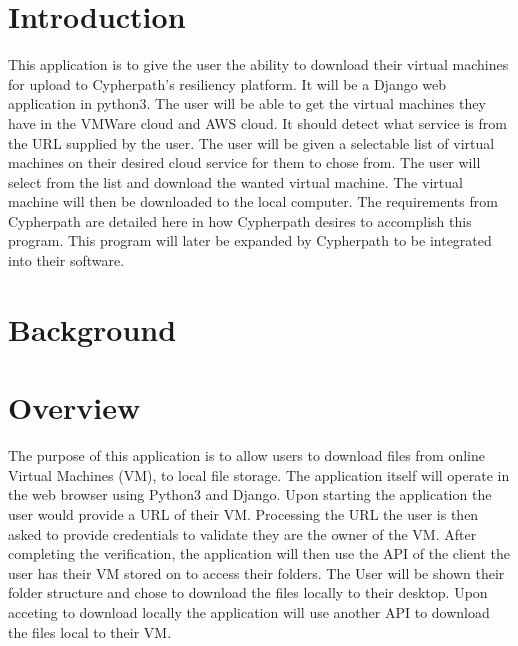 \documentclass{article}
\title{}
\author{}
\date{}
\begin{document}
    

    \tableofcontents
    \listoffigures

    \newpage
    \begin{versionhistory}
    \end{versionhistory}
    \newpage

    \section{Introduction}
    This application is to give the user the ability to download their virtual machines for upload to Cypherpath’s resiliency platform. It will be a Django web application in python3. The user will be able to get the virtual machines they have in the VMWare cloud and AWS cloud. It should detect what service is from the URL supplied by the user. The user will be given a selectable list of virtual machines on their desired cloud service for them to chose from. The user will select from the list and download the wanted virtual machine. The virtual machine will then be downloaded to the local computer. 
    The requirements from Cypherpath are detailed here in how Cypherpath desires to accomplish this program. This program will later be expanded by Cypherpath to be integrated into their software.     
    
    \section{Background}

    \section{Overview}

    The purpose of this application is to allow users to download files from online Virtual Machines (VM), to local file storage.
    The application itself will operate in the web browser using Python3 and Django. Upon starting the application the user would
    provide a URL of their VM. Processing the URL the user is then asked to provide credentials to validate they are the owner of
    the VM. After completing the verification, the application will then use the API of the client the user has their VM stored on
    to access their folders. The User will be shown their folder structure and chose to download the files locally to their desktop.
    Upon acceting to download locally the application will use another API to download the files local to their VM.
\end{document}
